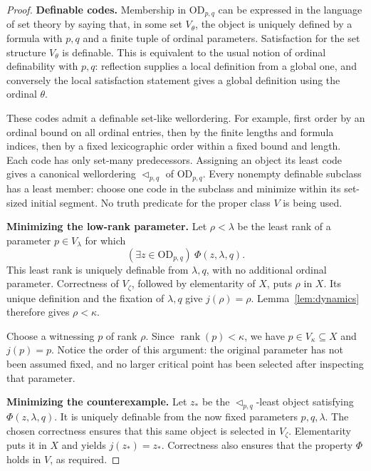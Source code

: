 \documentclass[11pt,letterpaper]{article}
\theoremstyle{definition}
\numberwithin{equation}{section}
\newcommand{\OD}{\mathrm{OD}}
\newcommand{\rank}{\operatorname{rank}}
\begin{document}
\begin{proof}
\textbf{Definable codes.}
Membership in $\OD_{p,q}$ can be expressed in the language of set theory by saying that, in some set $V_\theta$, the object is uniquely defined by a formula with $p,q$ and a finite tuple of ordinal parameters. Satisfaction for the set structure $V_\theta$ is definable. This is equivalent to the usual notion of ordinal definability with $p,q$: reflection supplies a local definition from a global one, and conversely the local satisfaction statement gives a global definition using the ordinal $\theta$.

These codes admit a definable set-like wellordering. For example, first order by an ordinal bound on all ordinal entries, then by the finite lengths and formula indices, then by a fixed lexicographic order within a fixed bound and length. Each code has only set-many predecessors. Assigning an object its least code gives a canonical wellordering $\triangleleft_{p,q}$ of $\OD_{p,q}$. Every nonempty definable subclass has a least member: choose one code in the subclass and minimize within its set-sized initial segment. No truth predicate for the proper class $V$ is being used.

\textbf{Minimizing the low-rank parameter.}
Let $\rho<\lambda$ be the least rank of a parameter $p\in V_\lambda$ for which
\begin{equation}\label{eq:badp}
 (\exists z\in\OD_{p,q})\ \Phi(z,\lambda,q).
\end{equation}
This least rank is uniquely definable from $\lambda,q$, with no additional ordinal parameter. Correctness of $V_\zeta$, followed by elementarity of $X$, puts $\rho$ in $X$. Its unique definition and the fixation of $\lambda,q$ give $j(\rho)=\rho$. Lemma~\ref{lem:dynamics} therefore gives $\rho<\kappa$.

Choose a witnessing $p$ of rank $\rho$. Since $\rank(p)<\kappa$, we have $p\in V_\kappa\subseteq X$ and $j(p)=p$. Notice the order of this argument: the original parameter has not been assumed fixed, and no larger critical point has been selected after inspecting that parameter.

\textbf{Minimizing the counterexample.}
Let $z_*$ be the $\triangleleft_{p,q}$-least object satisfying $\Phi(z,\lambda,q)$. It is uniquely definable from the now fixed parameters $p,q,\lambda$. The chosen correctness ensures that this same object is selected in $V_\zeta$. Elementarity puts it in $X$ and yields $j(z_*)=z_*$. Correctness also ensures that the property $\Phi$ holds in $V$, as required.


\end{proof}
\end{document}

